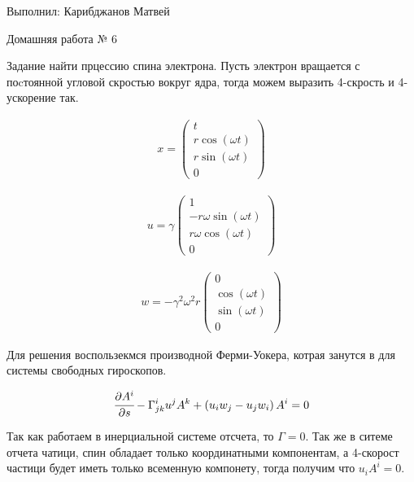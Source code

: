 \documentclass[a4paper]{article}
\newcommand{\inner}[1]{\left( #1 \right)}
\newcommand{\piv}[2]{\cfrac{\partial #1}{\partial #2}}
\numberwithin{equation}{section}
\begin{document}
\begin{flushright}
    Выполнил:
    Карибджанов Матвей

    Домашняя работа № 6
\end{flushright}
\pagestyle{main}

Задание найти прцессию спина электрона. Пусть электрон вращается с поcтоянной 
угловой скростью вокруг ядра, тогда можем выразить 4-скрость и 4-ускорение так.


\begin{gather}
    x = 
    \begin{pmatrix}
        t \\ r\cos(\omega t) \\ r\sin(\omega t) \\ 0
    \end{pmatrix}
\end{gather}

\begin{gather}
    u = 
    \gamma
    \begin{pmatrix}
        1 \\ -r\omega\sin(\omega t) \\ r\omega\cos(\omega t) \\ 0
    \end{pmatrix}
\end{gather}

\begin{gather}
    w =  -\gamma^2 \omega^2 r
    \begin{pmatrix}
        0 \\ \cos(\omega t) \\ \sin(\omega t) \\ 0
    \end{pmatrix}
\end{gather}

Для решения воспользекмся производной Ферми-Уокера, котрая занутся в для
системы свободных гироскопов.

\begin{eqnarray}
    \piv{A^i}{s} - \Gamma_{jk}^{i} u^j A^k + \inner{u_iw_j - u_jw_i}A^i = 0
\end{eqnarray}

Так как работаем в инерциальной системе отсчета, то $\Gamma = 0$. Так же 
в ситеме отчета чатици, спин обладает только координатными компонентам, а 
4-скорост частици будет иметь только всеменную компонету, тогда получим 
что $u_iA^i =0$.
\end{document}

